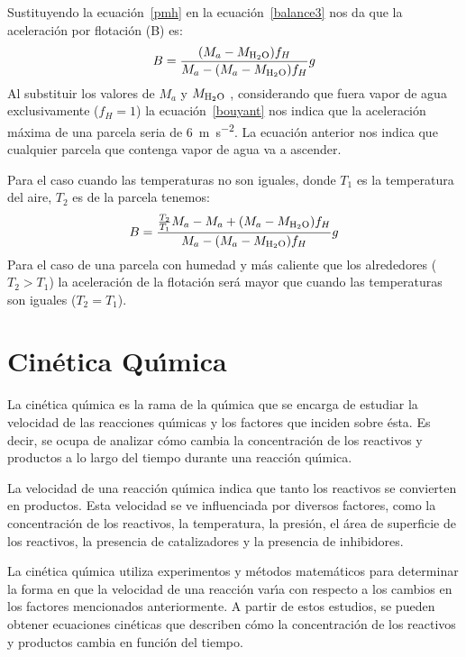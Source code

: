Sustituyendo la ecuaci\'on~\ref{pmh} en la ecuaci\'on~\ref{balance3} nos da que la aceleraci\'on por flotaci\'on (B) es:
\begin{equation}
B=\frac{(M_a-M_{\ce{H2O}})f_H }{M_a-(M_a-M_{\ce{H2O}})f_H} g
\label{bouyant}
\end{equation}
Al substituir los valores de $M_a$ y $M_{\ce{H2O}}$ , considerando que fuera  vapor de agua exclusivamente ($f_H=1$) la ecuaci\'on~\ref{bouyant} nos indica que la aceleraci\'on m\'axima de una parcela seria de  \SI{6}{\metre\per\square\second}. La ecuaci\'on anterior nos indica que cualquier parcela que contenga vapor de agua va a ascender.

Para el caso cuando las temperaturas no son iguales,  donde $T_1$ es la temperatura del aire, $T_2$ es de la parcela tenemos:
\begin{equation}
B=\frac{\frac{T_2}{T_1}M_a-M_a+(M_a-M_{\ce{H2O}})f_H }{M_a-(M_a-M_{\ce{H2O}})f_H} g
\label{bouyant2}
\end{equation}
Para el caso de una parcela con humedad y m\'as caliente que los alrededores ($T_2>T_1$) la aceleraci\'on de la flotaci\'on ser\'a mayor que cuando las temperaturas son iguales ($T_2=T_1$). 

\section[Cin\'etica]{Cin\'etica Qu\'{\i}mica}
\label{cineq}

La cin\'etica qu\'{\i}mica es la rama de la qu\'{\i}mica que se encarga de estudiar la velocidad de las reacciones qu\'{\i}micas y los factores que inciden sobre \'esta. Es decir, se ocupa de analizar c\'omo cambia la concentraci\'on de los reactivos y productos a lo largo del tiempo durante una reacci\'on qu\'{\i}mica.

La velocidad de una reacci\'on qu\'{\i}mica indica que tanto  los reactivos se convierten en productos. Esta velocidad se ve influenciada por diversos factores, como la concentraci\'on de los reactivos, la temperatura, la presi\'on, el \'area de superficie de los reactivos, la presencia de catalizadores y la presencia de inhibidores.

La cin\'etica qu\'{\i}mica utiliza experimentos y m\'etodos matem\'aticos para determinar la forma en que la velocidad de una reacci\'on var\'{\i}a con respecto a los cambios en los factores mencionados anteriormente. A partir de estos estudios, se pueden obtener ecuaciones cin\'eticas que describen c\'omo la concentraci\'on de los reactivos y productos cambia en funci\'on del tiempo.

